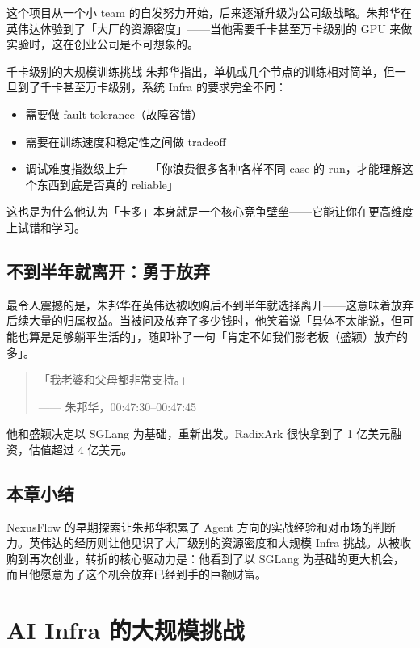 \documentclass[a4paper]{article}
\begin{document}
这个项目从一个小 team 的自发努力开始，后来逐渐升级为公司级战略。朱邦华在英伟达体验到了「大厂的资源密度」——当他需要千卡甚至万卡级别的 GPU 来做实验时，这在创业公司是不可想象的。

\begin{knowledgebox}{千卡级别的大规模训练挑战}
朱邦华指出，单机或几个节点的训练相对简单，但一旦到了千卡甚至万卡级别，系统 Infra 的要求完全不同：
\begin{itemize}
\item 需要做 fault tolerance（故障容错）
\item 需要在训练速度和稳定性之间做 tradeoff
\item 调试难度指数级上升——「你浪费很多各种各样不同 case 的 run，才能理解这个东西到底是否真的 reliable」
\end{itemize}
这也是为什么他认为「卡多」本身就是一个核心竞争壁垒——它能让你在更高维度上试错和学习。
\end{knowledgebox}

\subsection{不到半年就离开：勇于放弃}

最令人震撼的是，朱邦华在英伟达被收购后不到半年就选择离开——这意味着放弃后续大量的归属权益。当被问及放弃了多少钱时，他笑着说「具体不太能说，但可能也算是足够躺平生活的」，随即补了一句「肯定不如我们影老板（盛颖）放弃的多」。

\begin{quote}
「我老婆和父母都非常支持。」\par
\hfill —— 朱邦华，00:47:30--00:47:45
\end{quote}

他和盛颖决定以 SGLang 为基础，重新出发。RadixArk 很快拿到了 1 亿美元融资，估值超过 4 亿美元。

\subsection{本章小结}
NexusFlow 的早期探索让朱邦华积累了 Agent 方向的实战经验和对市场的判断力。英伟达的经历则让他见识了大厂级别的资源密度和大规模 Infra 挑战。从被收购到再次创业，转折的核心驱动力是：他看到了以 SGLang 为基础的更大机会，而且他愿意为了这个机会放弃已经到手的巨额财富。


\section{AI Infra 的大规模挑战}
\end{document}
